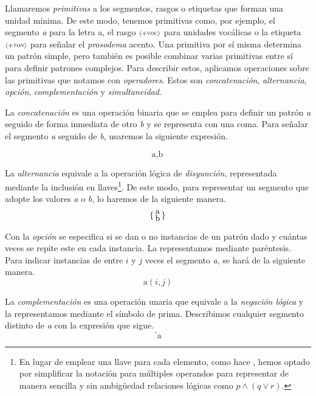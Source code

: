 Llamaremos \textit{primitivas} a los segmentos, rasgos o etiquetas que forman una unidad mínima. De este modo, tenemos primitivas como, por ejemplo, el segmento \textit{a} para la letra a, el rasgo ${\scriptstyle\langle{}+\textsc{voc}\rangle{}}$ para unidades vocálicas o la etiqueta ${\scriptstyle\langle{}+\textsc{ton}\rangle{}}$ para señalar el \textit{prosodema} acento. Una primitiva por sí misma determina un patrón simple, pero también es posible combinar varias primitivas entre sí para definir patrones complejos. Para describir estos, aplicamos operaciones sobre las primitivas que notamos con \textit{operadores}. Estos son \textit{concatenación}, \textit{alternancia}, \textit{opción}, \textit{complementación} y \textit{simultaneidad}.

La \textit{concatenación} es una operación binaria que se emplea para definir un patrón \textit{a} seguido de forma inmediata de otro \textit{b} y se representa con una coma. Para señalar el segmento \textit{a} seguido de \textit{b}, usaremos la siguiente expresión.

\[\text{a}, \text{b}\]

La \textit{alternancia} equivale a la operación lógica de \textit{disyunción}, representada mediante la inclusión en llaves\footnote{En lugar de emplear una llave para cada elemento, como hace \citeauthor{vanleuwen1989}, hemos optado por simplificar la notación para múltiples operandos para representar de manera sencilla y sin ambigüedad relaciones lógicas como $p \land (q \lor r)$.}. De este modo, para representar un segmento que adopte los valores \textit{a} o \textit{b}, lo haremos de la siguiente manera.
\[\{\begin{smallmatrix} \text{\normalsize{a}} \\ \text{\normalsize{b}}\end{smallmatrix}\}\]

Con la \textit{opción} se especifica si se dan o no instancias de un patrón dado y cuántas veces se repite este en cada instancia. La representamos mediante paréntesis. Para indicar instancias de entre $i$ y $j$ veces el segmento \textit{a}, se hará de la siguiente manera.
\[\text{a}(i,j)\]

La \textit{complementación} es una operación unaria que equivale a la \textit{negación lógica} y la representamos mediante el símbolo de prima. Describimos cualquier segmento distinto de \textit{a} con la expresión que sigue.
\[\text{ˈa} \]

